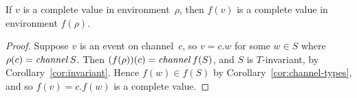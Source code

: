 \begin{lemma}
\label{lem:complete}
If $v$ is a complete value in environment~$\rho$, then $f(v)$ is a complete
value in environment $f(\rho)$.
\end{lemma}

\begin{proof}
Suppose $v$ is an event on channel~$c$, so $v = c.w$ for some $w \in S$ where
$\rho(c) = \mathop{\it channel} S$.  Then $(f(\rho))(c) = \mathop{\it channel} f(S)$, and $S$ is
$T$-invariant, by Corollary~\ref{cor:invariant}.  Hence $f(w) \in f(S)$ by
Corollary~\ref{cor:channel-types}, and so $f(v) = c.f(w)$ is a complete
value. 
\end{proof}
